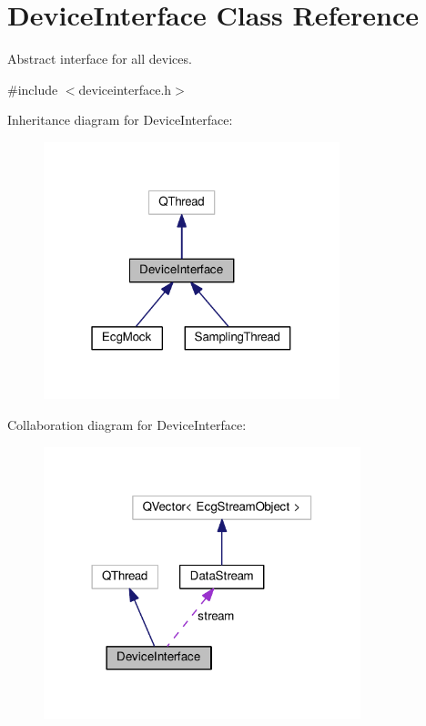\hypertarget{classDeviceInterface}{}\section{Device\+Interface Class Reference}
\label{classDeviceInterface}


Abstract interface for all devices.  




{\ttfamily \#include $<$deviceinterface.\+h$>$}



Inheritance diagram for Device\+Interface\+:\nopagebreak
\begin{figure}[H]
\begin{center}
\leavevmode
\includegraphics[width=244pt]{classDeviceInterface__inherit__graph}
\end{center}
\end{figure}


Collaboration diagram for Device\+Interface\+:\nopagebreak
\begin{figure}[H]
\begin{center}
\leavevmode
\includegraphics[width=261pt]{classDeviceInterface__coll__graph}
\end{center}
\end{figure}
